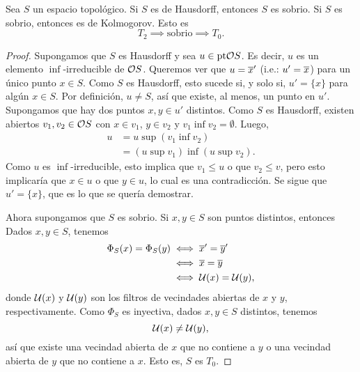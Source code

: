 \begin{lemma}
    Sea $S$ un espacio topológico.
    Si $S$ es de Hausdorff, entonces $S$ es sobrio.
    Si $S$ es sobrio, entonces es de Kolmogorov.
    Esto es
    \[
        T_2 \implies \text{sobrio}\implies T_0.
    \]
\end{lemma}
\begin{proof}
    Supongamos que $S$ es Hausdorff y sea $u\in\pt\cal OS$.
    Es decir, $u$ es un elemento $\inf$-irreducible de $\cal OS$.
    Queremos ver que $u=\ol{x}'$ (i.e.: $u'=\ol x$) para un único
    punto $x\in S$.
    Como $S$ es Hausdorff, esto sucede si, y solo si, $u'=\{x\}$
    para algún $x\in S$.
    Por definición, $u\neq S$, así que existe,
    al menos, un punto en $u'$.
    Supongamos que hay dos puntos $x,y\in u'$ distintos.
    Como $S$ es Hausdorff, existen abiertos $v_1,v_2\in\cal OS$
    con $x\in v_1$, $y\in v_2$ y $v_1\inf v_2=\emptyset$.
    Luego,
    \begin{align*}
        u
        &= u\sup(v_1\inf v_2) \\
        &= (u\sup v_1)\inf (u\sup v_2).
    \end{align*}
    Como $u$ es $\inf$-irreducible, esto implica que $v_1\leq u$
    o que $v_2\leq v$, pero esto implicaría que $x\in u$ o que $y\in u$,
    lo cual es una contradicción.
    Se sigue que $u'=\{x\}$, que es lo que se quería demostrar.
    
    Ahora supongamos que $S$ es sobrio.
    Si $x,y\in S$ son puntos distintos, entonces
    Dados $x,y\in S$, tenemos
    \begin{align*}
        \Phi_S(x) = \Phi_S(y)
        &\iff \ol{x}' = \ol{y}' \\
        &\iff \ol x = \ol y \\
        &\iff \cal U(x) = \cal U(y),
    \end{align*}
    donde $\cal U(x)$ y $\cal U(y)$ son los filtros
    de vecindades abiertas de $x$ y $y$, respectivamente.
    Como $\Phi_S$ es inyectiva, dados $x,y\in S$ distintos, tenemos
    \[
        \cal U(x)\neq\cal U(y),
    \]
    así que existe una vecindad abierta de $x$ que no contiene a $y$
    o una vecindad abierta de $y$ que no contiene a $x$.
    Esto es, $S$ es $T_0$.
\end{proof}

